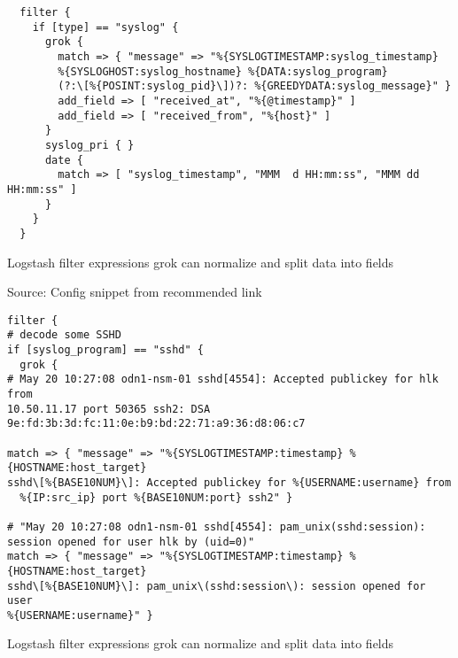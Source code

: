 \documentclass[Screen16to9,17pt]{foils}
\begin{document}


{\footnotesize
\begin{verbatim}
  filter {
    if [type] == "syslog" {
      grok {
        match => { "message" => "%{SYSLOGTIMESTAMP:syslog_timestamp}
        %{SYSLOGHOST:syslog_hostname} %{DATA:syslog_program}
        (?:\[%{POSINT:syslog_pid}\])?: %{GREEDYDATA:syslog_message}" }
        add_field => [ "received_at", "%{@timestamp}" ]
        add_field => [ "received_from", "%{host}" ]
      }
      syslog_pri { }
      date {
        match => [ "syslog_timestamp", "MMM  d HH:mm:ss", "MMM dd HH:mm:ss" ]
      }
    }
  }
\end{verbatim}
}

\begin{list2}
\item Logstash filter expressions grok can normalize and split data into fields
\end{list2}

Source:
Config snippet from recommended link\\
{\small{}}



{\footnotesize
\begin{verbatim}
filter {
# decode some SSHD
if [syslog_program] == "sshd" {
  grok {
# May 20 10:27:08 odn1-nsm-01 sshd[4554]: Accepted publickey for hlk from
10.50.11.17 port 50365 ssh2: DSA 9e:fd:3b:3d:fc:11:0e:b9:bd:22:71:a9:36:d8:06:c7

match => { "message" => "%{SYSLOGTIMESTAMP:timestamp} %{HOSTNAME:host_target}
sshd\[%{BASE10NUM}\]: Accepted publickey for %{USERNAME:username} from
  %{IP:src_ip} port %{BASE10NUM:port} ssh2" }

# "May 20 10:27:08 odn1-nsm-01 sshd[4554]: pam_unix(sshd:session):
session opened for user hlk by (uid=0)"
match => { "message" => "%{SYSLOGTIMESTAMP:timestamp} %{HOSTNAME:host_target}
sshd\[%{BASE10NUM}\]: pam_unix\(sshd:session\): session opened for user
%{USERNAME:username}" }
\end{verbatim}
}

\begin{list2}
\item Logstash filter expressions grok can normalize and split data into fields
\end{list2}





\slidenext{}
\end{document}
